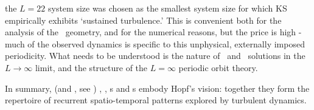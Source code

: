 the {\KS} $L=22$ system size was chosen as the smallest
system size for which KS empirically exhibits
`sustained turbulence.'
This is convenient both for
the analysis of the \statesp\ geometry, and for the numerical reasons,
 but the price is high - much of the
observed dynamics is specific to this unphysical, externally
imposed periodicity. What needs to be
understood is the nature of \eqv\ and \rpo\ solutions in the
$L \to \infty$ limit, and the structure of the $L = \infty$ periodic orbit
theory.

In summary, {\KS} (and \pCf, see )  \eqva, \reqva, \po s and
\rpo s embody Hopf's vision: together they form the
 repertoire of recurrent spatio-temporal
patterns explored by turbulent dynamics.
